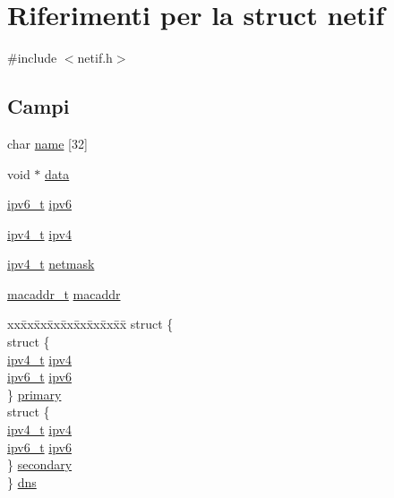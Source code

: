 \hypertarget{structnetif}{\section{Riferimenti per la struct netif}
\label{structnetif}
}


{\ttfamily \#include $<$netif.\+h$>$}

\subsection*{Campi}
\begin{DoxyCompactItemize}
\item 
char \hyperlink{structnetif_ad113ca0a458623939eec5ce7fe2b6eef}{name} \mbox{[}32\mbox{]}
\item 
void $\ast$ \hyperlink{structnetif_af45fb467da3492eb4473cb9208044ac8}{data}
\item 
\hyperlink{netif_8h_a0a195da7affbedb767969c3a02c9a82d}{ipv6\+\_\+t} \hyperlink{structnetif_aced1ed63f6f33dd3987a06deee6a2292}{ipv6}
\item 
\hyperlink{netif_8h_aea29db0d4ae23303ff7591af75c7b74a}{ipv4\+\_\+t} \hyperlink{structnetif_a312a8e870ce8803f02f5b09012ce6bc6}{ipv4}
\item 
\hyperlink{netif_8h_aea29db0d4ae23303ff7591af75c7b74a}{ipv4\+\_\+t} \hyperlink{structnetif_a36ef3cfb5f0403df355dc6db0ddc2426}{netmask}
\item 
\hyperlink{netif_8h_a95d524a06a1ff12a314f88bac04db658}{macaddr\+\_\+t} \hyperlink{structnetif_a7a5c433a646e2b4424fe8ebf12db535c}{macaddr}
\item 
\begin{tabbing}
xx\=xx\=xx\=xx\=xx\=xx\=xx\=xx\=xx\=\kill
struct \{\\
\>struct \{\\
\>\>\hyperlink{netif_8h_aea29db0d4ae23303ff7591af75c7b74a}{ipv4\_t} \hyperlink{structnetif_a312a8e870ce8803f02f5b09012ce6bc6}{ipv4}\\
\>\>\hyperlink{netif_8h_a0a195da7affbedb767969c3a02c9a82d}{ipv6\_t} \hyperlink{structnetif_aced1ed63f6f33dd3987a06deee6a2292}{ipv6}\\
\>\} \hyperlink{structnetif_a367e7d85725497d7703bfc0424f472cf}{primary}\\
\>struct \{\\
\>\>\hyperlink{netif_8h_aea29db0d4ae23303ff7591af75c7b74a}{ipv4\_t} \hyperlink{structnetif_a312a8e870ce8803f02f5b09012ce6bc6}{ipv4}\\
\>\>\hyperlink{netif_8h_a0a195da7affbedb767969c3a02c9a82d}{ipv6\_t} \hyperlink{structnetif_aced1ed63f6f33dd3987a06deee6a2292}{ipv6}\\
\>\} \hyperlink{structnetif_a793ad0cb27997bfa7874a2097a77b0e2}{secondary}\\
\} \hyperlink{structnetif_a30f1247e8e2ef8ac954833c81873608e}{dns}\\


\end{tabbing}
\end{DoxyCompactItemize}
